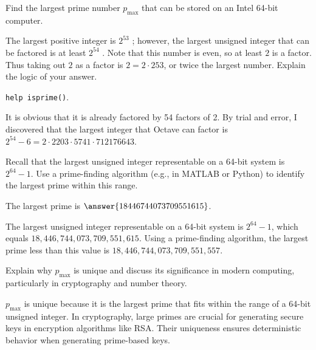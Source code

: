 \documentclass{ximera}
\author{Jont Allen}
\begin{document}
\begin{problem}
    Find the largest prime number $p_{\text{max}}$ that can be stored on an Intel 64-bit computer. 
    
    \begin{multipleChoice}
    \end{multipleChoice}
       \begin{hint} 
       The largest positive integer is $2^53$ ; however, the largest unsigned integer that can be factored is at least $2^54$ . Note that this number
is even, so at least $2$ is a factor. Thus taking out $2$ as a factor is $2 = 2 \cdot 253$, or twice the largest number. Explain the logic of your
answer.
\end{hint}
\begin{hint} \texttt{help isprime()}.
\end{hint}
\begin{feedback}[correct]
It is obvious that it is already factored by 54 factors of 2. By trial and error, I discovered that the largest integer that Octave
can factor is $2^54 - 6 = 2 \cdot 2203 \cdot 5741 \cdot 712176643$.
    \end{feedback}
    \end{problem}
    
    \begin{problem}
    Recall that the largest unsigned integer representable on a 64-bit system is $2^{64} - 1$. 
    Use a prime-finding algorithm (e.g., in MATLAB or Python) to identify the largest prime within this range.

    The largest prime is $\answer{18446744073709551615}$.
    \begin{feedback}[correct]
        The largest unsigned integer representable on a 64-bit system is $2^{64} - 1$, which equals $18,446,744,073,709,551,615$. 
Using a prime-finding algorithm, the largest prime less than this value is $18,446,744,073,709,551,557$.
    \end{feedback}
    \end{problem}
    
    \begin{problem}
    Explain why $p_{\text{max}}$ is unique and discuss its significance in modern computing, 
    particularly in cryptography and number theory.
    \begin{multipleChoice}
    \end{multipleChoice}
    \begin{feedback}[correct]
$p_{\text{max}}$ is unique because it is the largest prime that fits within the range of a 64-bit unsigned integer. 
In cryptography, large primes are crucial for generating secure keys in encryption algorithms like RSA. 
Their uniqueness ensures deterministic behavior when generating prime-based keys.
\end{feedback}


    \end{problem}
\end{document}
